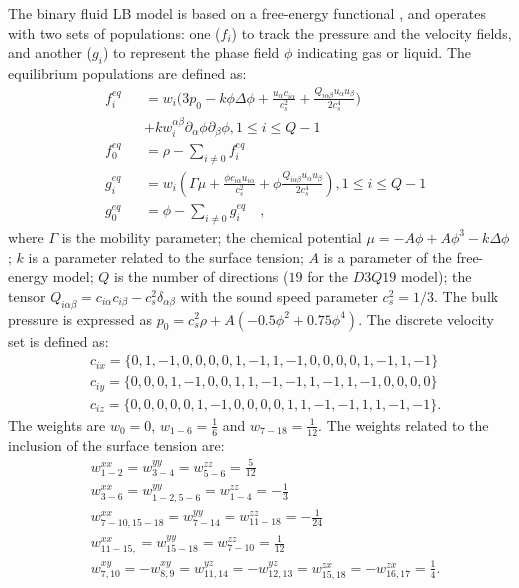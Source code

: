 \documentclass[preprint,12pt]{elsarticle}
\begin{document}
The binary fluid LB model is
based on a free-energy functional \cite{swift,landau}, and operates with two
sets of populations: one ($f_i$) to track the pressure and the velocity fields, and another ($g_i$) to represent the
phase field $\phi$ indicating gas or liquid.
The equilibrium populations \cite{pooley-contact} are defined as:
\begin{equation}
\label{set:equilibrium:binary}
\begin{aligned}
&f_i^{eq}&&=w_i 
\biggl(3
p_0 - k \phi \Delta \phi
+\frac{u_{\alpha}c_{i\alpha}}{c_s^2}+\frac{Q_{i\alpha\beta}u_{\alpha } u_ {
\beta}}{2 c_s^4}\biggr)\\
&&&+k w_i^{\alpha\beta} \partial_{\alpha} \phi\partial_{\beta} \phi, 1\leq i \leq Q-1\\
&f_0^{eq}&&=\rho-\sum_{i\neq0}{f_i^{eq}}\\
&g_i^{eq}&&=w_i\left(\Gamma \mu + \frac{\phi c_{i\alpha} u_{i\alpha}}{c_s^2}+\phi
\frac{Q_{i\alpha\beta}u_{\alpha}u_{\beta}}{2 c_s^4}\right), 1 \leq i \leq Q-1\\
&g_0^{eq}&&=\phi-\sum_{i\neq0}{g_i^{eq}}\quad,
\end{aligned}
\end{equation}
where $\Gamma$ is the mobility parameter; the chemical potential
$\mu=-A\phi+A\phi^3-k\Delta\phi$; $k$ is a parameter related to the surface
tension; $A$ is a parameter of the free-energy model; $Q$ is the number of directions ($19$
for the $D3Q19$ model); the tensor
$Q_{i\alpha\beta}=c_{i\alpha} c_{i\beta} - c_s^2 \delta_{\alpha\beta}$ with
the sound speed parameter $c_s^2=1/3$. The bulk pressure
is expressed as $p_0=c_s^2 \rho +A (-0.5 \phi^2+0.75 \phi^4)$. The discrete velocity set is defined as:
\begin{equation} 
\begin{aligned}
&c_{ix}=\{0,1,-1,0, 0,0, 0,1,-1, 1,-1,0, 0, 0, 0,1,-1, 1,-1\}\\
&c_{iy}=\{0,0, 0,1,-1,0, 0,1, 1,-1,-1,1,-1, 1,-1,0, 0, 0, 0\}\\
&c_{iz}=\{0,0, 0,0, 0,1,-1,0, 0, 0, 0,1, 1,-1,-1,1, 1,-1,-1\}.
\end{aligned}
\end{equation}
The weights are $w_0=0$, $w_{1-6}=\frac{1}{6}$ and $w_{7-18}=\frac{1}{12}$. The weights
related to the inclusion of the surface tension are:
\begin{equation}
\begin{aligned}
&w^{xx}_{1-2}=w^{yy}_{3-4}=w^{zz}_{5-6}=\frac{5}{12}\\
&w^{xx}_{3-6}=w^{yy}_{1-2,5-6}=w^{zz}_{1-4}=-\frac{1}{3}\\
&w^{xx}_{7-10,15-18}=w^{yy}_{7-14}=w^{zz}_{11-18}=-\frac{1}{24}\\
&w^{xx}_{11-15,}=w^{yy}_{15-18}=w^{zz}_{7-10}=\frac{1}{12}\\
&w^{xy}_{7,10}=-w^{xy}_{8,9}=w^{yz}_{11,14}=-w^{yz}_{12,13}=w^{zx}_{15,18}=-w^{zx}_{16,17}=\frac{1}{
4}.
\end{aligned}
\end{equation}
\end{document}
